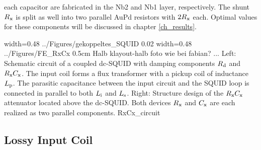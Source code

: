 each capacitor are fabricated in the Nb2 and Nb1 layer, respectively. The shunt $R_{\rm x}$ is split as well into two parallel AuPd resistors with $2R_{\rm x}$ each. Optimal values for these components will be discussed in chapter \ref{ch_results}.

{width=0.48\textwidth}
{../Figures/gekoppeltes_SQUID}
{0.02\textwidth} %
{width=0.48\textwidth}
{../Figures/FE_RxCx}
{0.5cm} %
{Halb klayout-halb foto wie bei fabian? ... Left: Schematic circuit of a coupled dc-SQUID with damping components $R_{\rm d}$ and $R_{\rm x}C_{\rm x}$. The input coil forms a flux transformer with a pickup coil of inductance $L_{\rm p}$. The parasitic capacitance between the input circuit and the SQUID loop is connected in parallel to both $L_{\rm i}$ and $L_{\rm s}$. Right: Structure design of the $R_{\rm x}C_{\rm x}$ attenuator located above the dc-SQUID. Both devices $R_{\rm x}$ and $C_{\rm x}$ are each realized as two parallel components.}
{RxCx_circuit}

\subsection{Lossy Input Coil}\label{subsec_L_FE}


